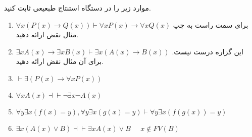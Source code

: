 
	موارد زیر را در دستگاه استنتاج طبعیعی ثابت کنید.
	\LTR
	\begin{enumerate}[label = \roman*)]
		\item 
			$\forall x (P(x) \to Q(x)) \vdash \forall x P(x) \to \forall x Q(x)$
			برای سمت راست به چپ مثال نقض ارائه دهید.
		\item 
			$\exists x A(x) \to \exists x B(x) \vdash \exists x(A(x) \to B(x))$
			این گزاره درست نیست. برای آن مثال نقض ارائه دهید.
		\item 
			$\vdash \exists (P(x) \to \forall x P(x))$
		\item
			$\forall x A(x) \dashv\vdash \neg \exists x \neg 	A(x)$
		\item
			$\forall y \exists x (f(x) = y), \forall y \exists x (g(x) = y) \vdash \forall y \exists x (f(g(x)) = y)$
		\item
			$\exists x(A(x) \vee B) \dashv\vdash \exists x A(x) \vee B \;\;\;\;\; x \notin FV(B)$
		 	
	\end{enumerate}
